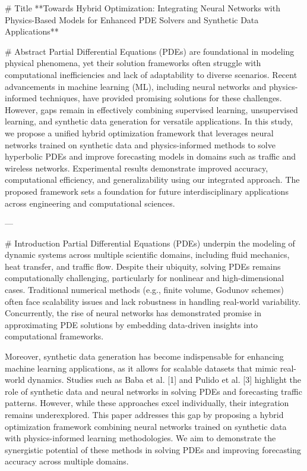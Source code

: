 # Title  
**Towards Hybrid Optimization: Integrating Neural Networks with Physics-Based Models for Enhanced PDE Solvers and Synthetic Data Applications**

# Abstract  
Partial Differential Equations (PDEs) are foundational in modeling physical phenomena, yet their solution frameworks often struggle with computational inefficiencies and lack of adaptability to diverse scenarios. Recent advancements in machine learning (ML), including neural networks and physics-informed techniques, have provided promising solutions for these challenges. However, gaps remain in effectively combining supervised learning, unsupervised learning, and synthetic data generation for versatile applications. In this study, we propose a unified hybrid optimization framework that leverages neural networks trained on synthetic data and physics-informed methods to solve hyperbolic PDEs and improve forecasting models in domains such as traffic and wireless networks. Experimental results demonstrate improved accuracy, computational efficiency, and generalizability using our integrated approach. The proposed framework sets a foundation for future interdisciplinary applications across engineering and computational sciences.  

---

# Introduction  
Partial Differential Equations (PDEs) underpin the modeling of dynamic systems across multiple scientific domains, including fluid mechanics, heat transfer, and traffic flow. Despite their ubiquity, solving PDEs remains computationally challenging, particularly for nonlinear and high-dimensional cases. Traditional numerical methods (e.g., finite volume, Godunov schemes) often face scalability issues and lack robustness in handling real-world variability. Concurrently, the rise of neural networks has demonstrated promise in approximating PDE solutions by embedding data-driven insights into computational frameworks.

Moreover, synthetic data generation has become indispensable for enhancing machine learning applications, as it allows for scalable datasets that mimic real-world dynamics. Studies such as Baba et al. [1] and Pulido et al. [3] highlight the role of synthetic data and neural networks in solving PDEs and forecasting traffic patterns. However, while these approaches excel individually, their integration remains underexplored. This paper addresses this gap by proposing a hybrid optimization framework combining neural networks trained on synthetic data with physics-informed learning methodologies. We aim to demonstrate the synergistic potential of these methods in solving PDEs and improving forecasting accuracy across multiple domains.  

